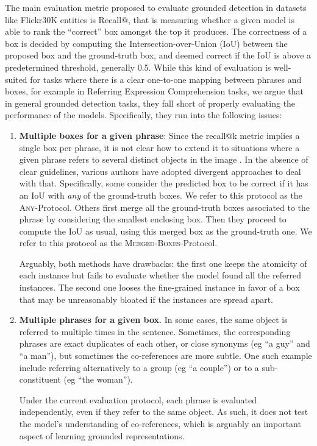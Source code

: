 The main evaluation metric proposed to evaluate grounded detection in datasets like Flickr30K entities\cite{plummer2015flickr30k} is Recall@, that is measuring whether a given model is able to rank the ``correct'' box amongst the top  it produces. The correctness of a box is decided by computing the Intersection-over-Union (IoU) between the proposed box and the ground-truth box, and deemed correct if the IoU is above a predetermined threshold, generally 0.5.
While this kind of evaluation is well-suited for tasks where there is a clear one-to-one mapping between phrases and boxes, for example in Referring Expression Comprehension tasks, we argue that in general grounded detection tasks, they fall short of properly evaluating the performance of the models. Specifically, they run into the following issues:
\begin{enumerate}
    \item \textbf{Multiple boxes for a given phrase}: Since the recall@k metric implies a single box per phrase, it is not clear how to extend it to situations where a given phrase refers to several distinct objects in the image . In the absence of clear guidelines, various authors have adopted divergent approaches to deal with that. Specifically, some \cite{li2019visualbert,kim2018bilinear} consider the predicted box to be correct if it has an IoU with \emph{any} of the ground-truth boxes. We refer to this protocol as the \textsc{Any}-Protocol. Others \cite{plummer2020revisiting,yang2019fast} first merge all the ground-truth boxes associated to the phrase by considering the smallest enclosing box. Then they proceed to compute the IoU as usual, using this merged box as the ground-truth one. We refer to this protocol as the \textsc{Merged-Boxes}-Protocol.
    
    Arguably, both methods have drawbacks: the first one keeps the atomicity of each instance but fails to evaluate whether the model found all the referred instances. The second one looses the fine-grained instance in favor of a box that may be unreasonably bloated if the instances are spread apart. 

    \item \textbf{Multiple phrases for a given box}. In some cases, the same object is referred to multiple times in the sentence. Sometimes, the corresponding phrases are exact duplicates of each other, or close synonyms (eg ``a guy'' and ``a man''), but sometimes the co-references are more subtle. One such example include referring alternatively to a group (eg ``a couple'') or to a sub-constituent (eg ``the woman'').
    
    Under the current evaluation protocol, each phrase is evaluated independently, even if they refer to the same object. As such, it does not test the model's understanding of co-references, which is arguably an important aspect of learning grounded representations.
    
\end{enumerate}

